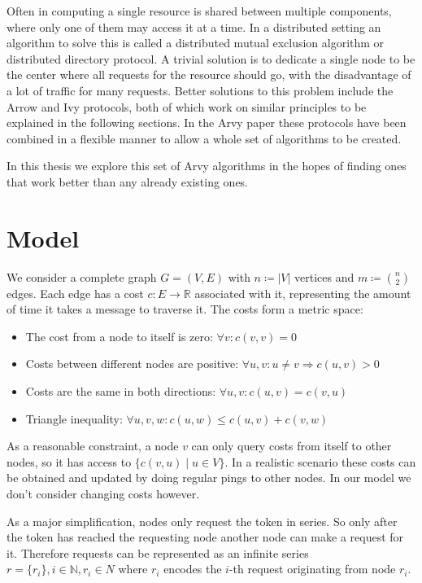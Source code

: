\documentclass[a4paper, oneside]{discothesis}
\begin{document}
Often in computing a single resource is shared between multiple components, where only one of them may access it at a time. In a distributed setting an algorithm to solve this is called a distributed mutual exclusion algorithm or distributed directory protocol. A trivial solution is to dedicate a single node to be the center where all requests for the resource should go, with the disadvantage of a lot of traffic for many requests. Better solutions to this problem include the Arrow and Ivy protocols, both of which work on similar principles to be explained in the following sections. In the Arvy paper these protocols have been combined in a flexible manner to allow a whole set of algorithms to be created.

In this thesis we explore this set of Arvy algorithms in the hopes of finding ones that work better than any already existing ones.

\section{Model}

We consider a complete graph $G=(V,E)$ with $n\coloneqq|V|$ vertices and $m\coloneqq\binom{n}{2}$ edges. Each edge has a cost $c : E \rightarrow \mathbb{R}$ associated with it, representing the amount of time it takes a message to traverse it. The costs form a metric space:
\begin{itemize}
\item The cost from a node to itself is zero: $\forall v:c(v, v)=0$
\item Costs between different nodes are positive: $\forall u,v : u\neq v\Rightarrow c(u,v)>0$
\item Costs are the same in both directions: $\forall u,v : c(u,v)=c(v,u)$
\item Triangle inequality: $\forall u,v,w : c(u,w)\leq c(u,v)+c(v,w)$
\end{itemize}

As a reasonable constraint, a node $v$ can only query costs from itself to other nodes, so it has access to $\{c(v, u)\;|\;u\in V\}$. In a realistic scenario these costs can be obtained and updated by doing regular pings to other nodes. In our model we don't consider changing costs however.

As a major simplification, nodes only request the token in series. So only after the token has reached the requesting node another node can make a request for it. Therefore requests can be represented as an infinite series $r=\{r_i\},i\in\mathbb{N},r_i\in N$ where $r_i$ encodes the $i$-th request originating from node $r_i$.
\end{document}
